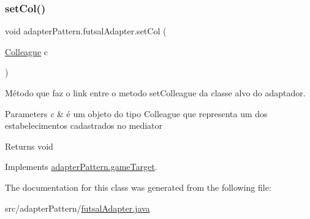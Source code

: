 \subsubsection{\texorpdfstring{setCol()}{setCol()}}
{\footnotesize\ttfamily void adapter\+Pattern.\+futsal\+Adapter.\+set\+Col (\begin{DoxyParamCaption}\item[{\mbox{\hyperlink{classmediator_pattern_1_1_colleague}{Colleague}}}]{c }\end{DoxyParamCaption})}



Método que faz o link entre o metodo set\+Colleague da classe alvo do adaptador. 


\begin{DoxyParams}{Parameters}
{\em c} & é um objeto do tipo Colleague que representa um dos estabelecimentos cadastrados no mediator \\
\hline
\end{DoxyParams}
\begin{DoxyReturn}{Returns}
void 
\end{DoxyReturn}


Implements \mbox{\hyperlink{interfaceadapter_pattern_1_1game_target_ae4493af8f85c0459e4e628ffff3fe3b9}{adapter\+Pattern.\+game\+Target}}.



The documentation for this class was generated from the following file\+:\begin{DoxyCompactItemize}
\item 
src/adapter\+Pattern/\mbox{\hyperlink{futsal_adapter_8java}{futsal\+Adapter.\+java}}\end{DoxyCompactItemize}
